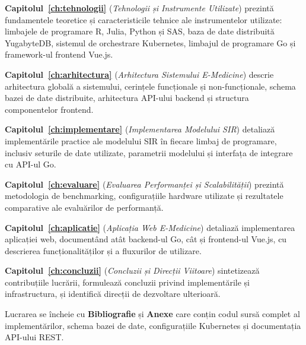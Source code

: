 \textbf{Capitolul~\ref{ch:tehnologii}} (\emph{Tehnologii și Instrumente Utilizate})
prezintă fundamentele teoretice și caracteristicile tehnice ale instrumentelor
utilizate: limbajele de programare R, Julia, Python și SAS, baza de date
distribuită YugabyteDB, sistemul de orchestrare Kubernetes, limbajul de
programare Go și framework-ul frontend Vue.js.

\textbf{Capitolul~\ref{ch:arhitectura}} (\emph{Arhitectura Sistemului E-Medicine})
descrie arhitectura globală a sistemului, cerințele funcționale și non-funcționale,
schema bazei de date distribuite, arhitectura API-ului backend și structura
componentelor frontend.

\textbf{Capitolul~\ref{ch:implementare}} (\emph{Implementarea Modelului SIR})
detaliază implementările practice ale modelului SIR în fiecare limbaj de
programare, inclusiv seturile de date utilizate, parametrii modelului și
interfața de integrare cu API-ul Go.

\textbf{Capitolul~\ref{ch:evaluare}} (\emph{Evaluarea Performanței și
Scalabilității}) prezintă metodologia de benchmarking, configurațiile hardware
utilizate și rezultatele comparative ale evaluărilor de performanță.

\textbf{Capitolul~\ref{ch:aplicatie}} (\emph{Aplicația Web E-Medicine})
detaliază implementarea aplicației web, documentând atât backend-ul Go, cât și
frontend-ul Vue.js, cu descrierea funcționalităților și a fluxurilor de utilizare.

\textbf{Capitolul~\ref{ch:concluzii}} (\emph{Concluzii și Direcții Viitoare})
sintetizează contribuțiile lucrării, formulează concluzii privind implementările
și infrastructura, și identifică direcții de dezvoltare ulterioară.

Lucrarea se încheie cu \textbf{Bibliografie} și \textbf{Anexe} care conțin
codul sursă complet al implementărilor, schema bazei de date, configurațiile
Kubernetes și documentația API-ului REST.
